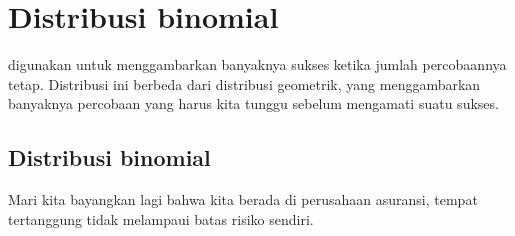 \section{Distribusi binomial}
\label{binomialModel}


digunakan untuk menggambarkan banyaknya sukses ketika jumlah percobaannya
tetap.
Distribusi ini berbeda dari distribusi geometrik, yang menggambarkan
banyaknya percobaan yang harus kita tunggu sebelum mengamati suatu sukses.


\subsection{Distribusi binomial}

\newcommand{\insureS}{\resp{tidak}}
\newcommand{\insureF}{\resp{melampaui}}
\newcommand{\insureBinomCinDSingleScenario}{0.103}
\newcommand{\insureBinomCinD}{0.412}
\newcommand{\insureBinomEinHSingleScenario}{0.00454}
\newcommand{\insureBinomEinH}{0.254}
\newcommand{\insureBinomFourtyExpValue}{28}
\newcommand{\insureBinomFourtySD}{2.9}
\newcommand{\insureBinomFourtyLower}{22}
\newcommand{\insureBinomFourtyUpper}{34}

\noindent%
Mari kita bayangkan lagi bahwa kita berada di perusahaan asuransi,
tempat \insureSperc{} tertanggung tidak melampaui batas risiko sendiri.


